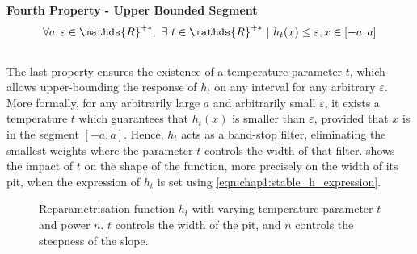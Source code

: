\noindent\textbf{Fourth Property - Upper Bounded Segment} \\

\begin{equation}
  \centering
  \forall a,\varepsilon \in\mathds{R}^{+\ast},~ \exists ~t
  \in\mathds{R}^{+\ast} ~ | ~ h_t(x) \leq \varepsilon, x \in [-a,a]
  \label{eqn:chap1:reparam_prop4}
\end{equation}
\\
The last property ensures the existence of a temperature parameter $t$, which
allows upper-bounding the response of $h_t$ on any interval for any arbitrary
$\varepsilon$. More formally, for any arbitrarily large $a$ and arbitrarily
small $\varepsilon$, it exists a temperature $t$ which guarantees that $h_t(x)$
is smaller than $\varepsilon$, provided that $x$ is in the segment $[-a, a]$.
Hence, $h_t$ acts as a band-stop filter, eliminating the smallest weights where
the parameter $t$ controls the width of that filter.
 shows the impact of $t$ on the shape of
the function, more precisely on the width of its pit, when the expression of
$h_t$ is set using \cref{eqn:chap1:stable_h_expression}.\\

\begin{figure}
  \centering
    \caption{
    Reparametrisation function $h_t$ with varying temperature parameter $t$ and
    power $n$. $t$ controls the width of the pit, and $n$ controls the steepness
    of the slope.}
  \label{fig:stopband}
\end{figure}

